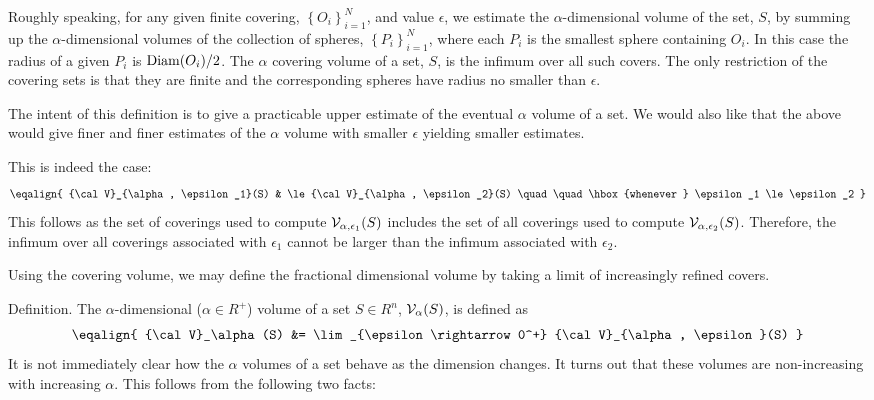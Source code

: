 {Roughly speaking, for any given finite covering, 
$\left\{ O_i \right\}_{i=1}^N$, and value $\epsilon$, 
we estimate the $\alpha$-dimensional volume of the set, $S$, by summing 
up the $\alpha$-dimensional volumes of the collection of spheres, 
$\left\{ P_i \right\}_{i=1}^N$, where each $P_i$ is the 
smallest sphere containing $O_i$. In this case the radius of a given 
$P_i$ is ${\rm Diam}(O_i) / 2$.
The $\alpha$ covering volume of a set, $S$, is the infimum over all 
such covers. The only restriction of the covering sets is that they are 
finite and the corresponding spheres have radius no smaller than $\epsilon$.

The intent of this definition is to give a practicable upper estimate of 
the eventual $\alpha$ volume of a set. We would also like that the above 
would give finer and finer estimates of the $\alpha$ volume with 
smaller $\epsilon$ yielding smaller estimates.

This is indeed the case:
$$
\eqalign{
	{\cal V}_{\alpha, \epsilon_1}(S) & \le {\cal V}_{\alpha, \epsilon_2}(S) \quad \quad \hbox{whenever  } \epsilon_1 \le \epsilon_2
}
$$
This follows as the set of coverings used to compute 
${\cal V}_{\alpha, \epsilon_1}(S)$ includes the set of all coverings used 
to compute ${\cal V}_{\alpha, \epsilon_2}(S)$. Therefore, the 
infimum over all coverings associated with $\epsilon_1$ cannot be larger
than the infimum associated with $\epsilon_2$.

Using the covering volume, we may define the fractional dimensional volume by
taking a limit of increasingly refined covers.

\proclaim Definition. The $\alpha$-dimensional ($\alpha \in R^{+}$)
volume of a set $S \in R^n$, ${\cal V}_\alpha(S)$,
is defined as
$$
\eqalign{
	{\cal V}_\alpha(S) &= \lim_{\epsilon \rightarrow 0^+} {\cal V}_{\alpha, \epsilon}(S)
}
$$
It is not immediately clear how the $\alpha$ volumes of a set behave as the 
dimension changes. It turns out that these volumes are non-increasing 
with increasing $\alpha$. This follows from the following two facts:

\beginEnum
{}
\endEnum

}
